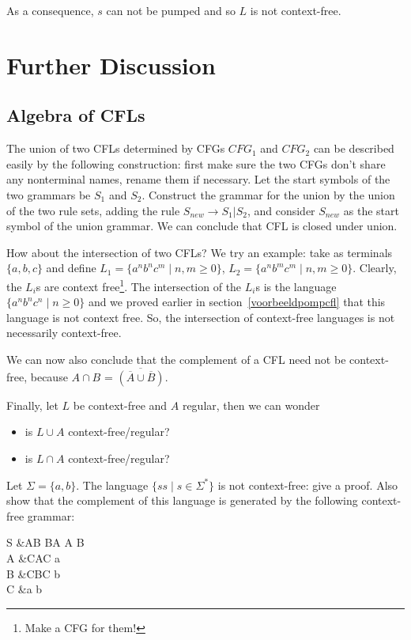 As a consequence, $s$ can not be pumped and so $L$ is not context-free.

\section{Further Discussion}

\subsection{Algebra of CFLs}
The union of two CFLs determined by CFGs $CFG_1$ and $CFG_2$ can be
described easily by the following construction: first make sure the two CFGs don't share any nonterminal names, rename them if necessary. Let the start symbols of the two
grammars be $S_1$ and $S_2$. Construct the grammar for the union by
the union of the two rule sets, adding the rule $S_{new} \rightarrow
S_1 | S_2$, and consider $S_{new}$ as the start symbol of the union
grammar. We can conclude that CFL is closed under union.

How about the intersection of two CFLs? We try an example: take as
terminals $\{a,b,c\}$ and define $L_1 = \{a^nb^nc^m\mid n,m \geq 0\}$,
$L_2 = \{a^nb^mc^m\mid n,m \geq 0\}$. Clearly, the $L_i$s are context
free\footnote{Make a CFG for them!}. The intersection of the $L_i$s is
the language $\{a^nb^nc^n\mid n \geq 0\}$ and we proved earlier in
section~\ref{voorbeeldpompcfl} that this language is not context
free. So, the intersection of context-free languages is not
necessarily context-free.

We can now also conclude that the complement of a CFL need not be
context-free, because $A \cap B$ = $\overline{(\overline{A} \cup \overline{B})}$.

\begin{exercise}
Finally, let $L$ be context-free and $A$ regular, then we can wonder

\begin{itemize}
	\item is $L \cup A$ context-free/regular?
	\item is $L \cap A$ context-free/regular?
\end{itemize}
\end{exercise}

\begin{exercise}
Let $\Sigma = \{a,b\}$.
The language $\{ss\mid s \in \Sigma^*\}$ is not context-free: give a
proof. Also show that the \label{zelfdoen1} complement of this
language is generated by the following context-free grammar:
\begin{grammar}\label{gr:complement}
	S &\rpijl AB \mid BA \mid A \mid B \\
	A &\rpijl CAC \mid a \\
	B &\rpijl CBC \mid b \\
	C &\rpijl a \mid b
\end{grammar}
\end{exercise}


